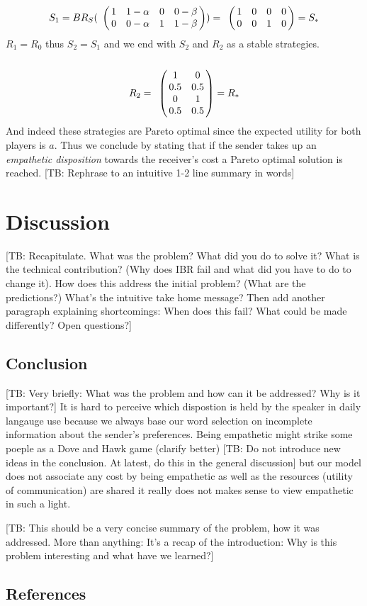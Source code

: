 \documentclass[10pt]{article}
\newcommand{\tb}[1]{\textcolor[rgb]{.8,.33,.0}{[TB: #1]}}%
\begin{document}
\begin{equation*}
S_1=BR_S(
\bordermatrix{
                & & & &    \cr
     &       1 &         1-\alpha & 0       & 0-\beta \cr
     &       0 &         0-\alpha & 1      & 1-\beta
 }
 )
=
\bordermatrix{
                & & & &    \cr
     &       1 &         0 & 0       & 0 \cr
     &       0 &         0 & 1      & 0
 }
 =S_*
 \end{equation*}
$R_1=R_0$ thus $S_2=S_1$ and we end with $S_2$ and $R_2$ as a stable strategies.
\begin{equation*}
  R_2= \bordermatrix{
              &  & \cr
      & 1 & 0 \cr
       & 0.5 & 0.5 \cr
       & 0 & 1 \cr
       & 0.5 & 0.5 \cr
   }
   =R_*
\end{equation*}
And indeed these strategies are Pareto optimal since the expected utility for both players is $a$. Thus we conclude by stating that if the sender takes up an \textit{empathetic disposition} towards the receiver's cost a Pareto optimal solution is reached. \tb{Rephrase to an intuitive 1-2 line summary in words}

\section{Discussion}

\tb{Recapitulate. What was the problem? What did you do to solve it? What is the technical contribution? (Why does IBR fail and what did you have to do to change it). How does this address the initial problem? (What are the predictions?) What's the intuitive take home message? Then add another paragraph explaining shortcomings: When does this fail? What could be made differently? Open questions?}

\subsection{Conclusion}

\tb{Very briefly: What was the problem and how can it be addressed? Why is it important?}
It is hard to perceive which dispostion is held by the speaker in daily langauge use because we always base our word selection on incomplete information about the sender's preferences.
Being empathetic might strike some poeple as a Dove and Hawk game (clarify better) \tb{Do not introduce new ideas in the conclusion. At latest, do this in the general discussion} but our model does not associate any cost by being empathetic as well as the resources (utility of communication) are shared it really does not makes sense to view empathetic in such a light.

\tb{This should be a very concise summary of the problem, how it was addressed. More than anything: It's a recap of the introduction: Why is this problem interesting and what have we learned?}
\subsection{References}
\end{document}
